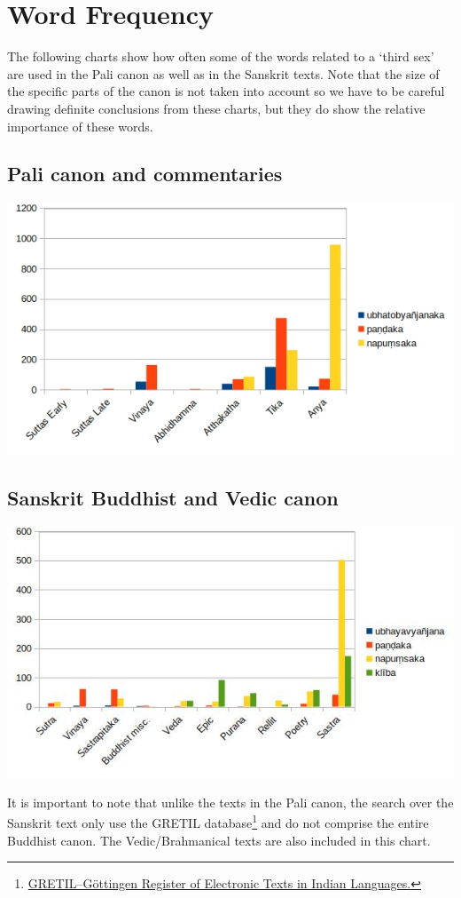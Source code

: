 \section{Word Frequency}
\label{appendix2}

The following charts show how often some of the words related to a `third sex' are used in the Pali canon as well as in the Sanskrit texts. Note that the size of the specific parts of the canon is not taken into account so we have to be careful drawing definite conclusions from these charts, but they do show the relative importance of these words. 

\subsection{Pali canon and commentaries}

\includegraphics[width=0.7\linewidth]{pali.jpg}
\label{pali1}

\subsection{Sanskrit Buddhist and Vedic canon}

\includegraphics[width=0.7\linewidth]{sanskrit.jpg}
\label{sanskrit1}

\medskip
It is important to note that unlike the texts in the Pali canon, the search over the Sanskrit text only use the GRETIL database\footnote{\href{http://gretil.sub.uni-goettingen.de/gretil.html}{GRETIL--Göttingen Register of Electronic Texts in Indian Languages.}} and do not comprise the entire Buddhist canon. The Vedic/Brahmanical texts are also included in this chart.
